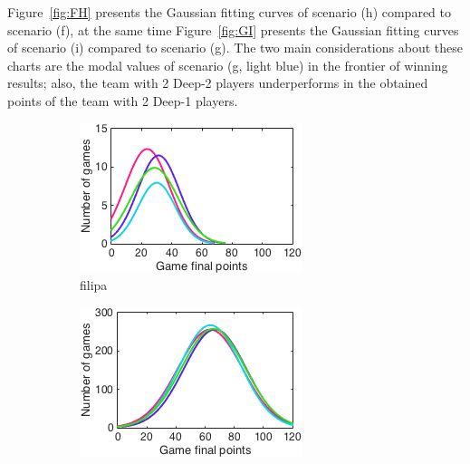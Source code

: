 Figure~\ref{fig:FH} presents the Gaussian fitting curves of scenario (h) compared to scenario (f), at the same time Figure~\ref{fig:GI} presents the Gaussian fitting curves of scenario (i) compared to scenario (g).
The two main considerations about these charts are the modal values of scenario (g, light blue) in the frontier of winning results; also, the team with 2 Deep-2 players underperforms in the obtained points of the team with 2 Deep-1 players.

\begin{figure}[h]
        \centering
        \begin{subfigure}[h]{0.32\textwidth}
                \includegraphics[width=\textwidth]{./img/4/FGHIhard}
                \caption{filipa}
                \label{fig:FGHIhard}
        \end{subfigure}
        \begin{subfigure}[h]{0.32\textwidth}
                \includegraphics[width=\textwidth]{./img/4/FGHImedium}

\end{subfigure}
\end{figure}
